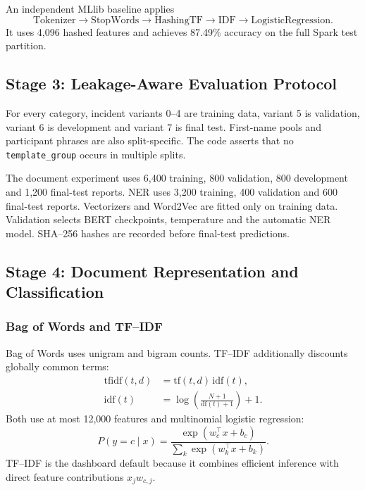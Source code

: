 \documentclass[conference]{IEEEtran}
\begin{document}
An independent MLlib baseline applies
\begin{equation}
\mathrm{Tokenizer}\to\mathrm{StopWords}\to
\mathrm{HashingTF}\to\mathrm{IDF}\to\mathrm{LogisticRegression}.
\end{equation}
It uses 4,096 hashed features and achieves 87.49\% accuracy on the full Spark test partition.

\subsection{Stage 3: Leakage-Aware Evaluation Protocol}

For every category, incident variants 0--4 are training data, variant 5 is validation, variant 6 is development and variant 7 is final test. First-name pools and participant phrases are also split-specific. The code asserts that no \texttt{template\_group} occurs in multiple splits.

The document experiment uses 6,400 training, 800 validation, 800 development and 1,200 final-test reports. NER uses 3,200 training, 400 validation and 600 final-test reports. Vectorizers and Word2Vec are fitted only on training data. Validation selects BERT checkpoints, temperature and the automatic NER model. SHA--256 hashes are recorded before final-test predictions.

\subsection{Stage 4: Document Representation and Classification}

\subsubsection{Bag of Words and TF--IDF}
Bag of Words uses unigram and bigram counts. TF--IDF additionally discounts globally common terms:
\begin{align}
\mathrm{tfidf}(t,d)&=\mathrm{tf}(t,d)\,\mathrm{idf}(t),\\
\mathrm{idf}(t)&=\log\left(\frac{N+1}{\mathrm{df}(t)+1}\right)+1.
\end{align}
Both use at most 12,000 features and multinomial logistic regression:
\begin{equation}
P(y=c\mid x)=
\frac{\exp(w_c^\top x+b_c)}
{\sum_k\exp(w_k^\top x+b_k)}.
\end{equation}
TF--IDF is the dashboard default because it combines efficient inference with direct feature contributions $x_jw_{c,j}$.
\end{document}
